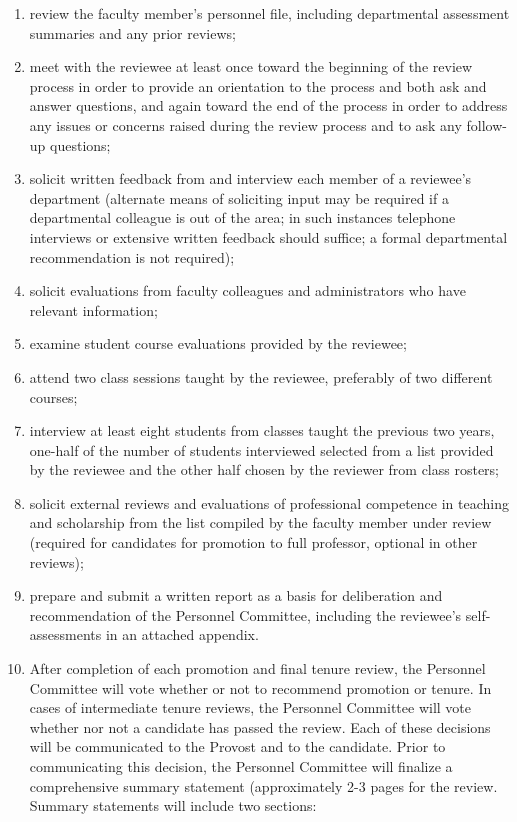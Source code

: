 \documentclass[letterpaper, 11pt]{article}
\begin{document}
				\begin{enumerate}[label=\arabic*)]
					\item{review the faculty member's personnel file, including departmental assessment summaries and any prior reviews;}
					\item{meet with the reviewee at least once toward the beginning of the review process in order to provide an orientation to the process and both ask and answer questions, and again toward the end of the process in order to address any issues or concerns raised during the review process and to ask any follow-up questions;}
					\item{solicit written feedback from and interview each member of a reviewee's department (alternate means of soliciting input may be required if a departmental colleague is out of the area; in such instances telephone interviews or extensive written feedback should suffice; a formal departmental recommendation is not required);}
					\item{solicit evaluations from faculty colleagues and administrators who have relevant information;}
					\item{examine student course evaluations provided by the reviewee;}
					\item{attend two class sessions taught by the reviewee, preferably of two different courses;}
					\item{interview at least eight students from classes taught the previous two years, one-half of the number of students interviewed selected from a list provided by the reviewee and the other half chosen by the reviewer from class rosters;}
					\item{solicit external reviews and evaluations of professional competence in teaching and scholarship from the list compiled by the faculty member under review (required for candidates for promotion to full professor, optional in other reviews);}
					\item{prepare and submit a written report as a basis for deliberation and recommendation of the Personnel Committee, including the reviewee's self-assessments in an attached appendix.}
					\item{After completion of each promotion and final tenure review, the Personnel Committee will vote whether or not to recommend promotion or tenure.  In cases of intermediate tenure reviews, the Personnel Committee will vote whether nor not a candidate has passed the review.  Each of these decisions will be communicated to the Provost and to the candidate.  Prior to communicating this decision, the Personnel Committee will finalize a comprehensive summary statement (approximately 2-3 pages for the review.  Summary statements will include two sections:
}
\end{enumerate}
\end{document}
